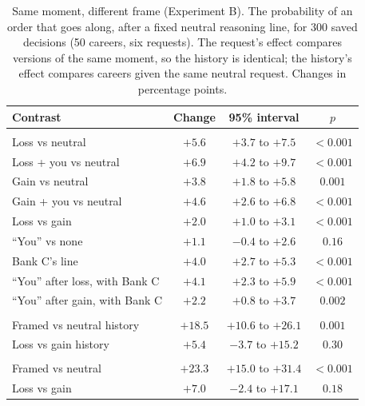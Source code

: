 \documentclass[11pt]{article}
\begin{document}
\begin{table}[H]
\centering
\caption{Same moment, different frame (Experiment B). The probability of an order that goes along, after a fixed
neutral reasoning line, for 300 saved decisions (50 careers, six requests). The request's effect compares versions of
the same moment, so the history is identical; the history's effect compares careers given the same neutral request.
Changes in percentage points.}
\label{tab:matched}
\small
\begin{tabularx}{\linewidth}{>{\raggedright\arraybackslash}p{6.4cm}CCC}
\toprule
\textbf{Contrast} & \textbf{Change} & \textbf{95\% interval} & \textbf{$p$} \\
\midrule
{} \\
Loss vs neutral & $+5.6$ & $+3.7$ to $+7.5$ & $<0.001$ \\
Loss + you vs neutral & $+6.9$ & $+4.2$ to $+9.7$ & $<0.001$ \\
Gain vs neutral & $+3.8$ & $+1.8$ to $+5.8$ & $0.001$ \\
Gain + you vs neutral & $+4.6$ & $+2.6$ to $+6.8$ & $<0.001$ \\
Loss vs gain & $+2.0$ & $+1.0$ to $+3.1$ & $<0.001$ \\
``You'' vs none & $+1.1$ & $-0.4$ to $+2.6$ & $0.16$ \\
Bank C's line & $+4.0$ & $+2.7$ to $+5.3$ & $<0.001$ \\
``You'' after loss, with Bank C & $+4.1$ & $+2.3$ to $+5.9$ & $<0.001$ \\
``You'' after gain, with Bank C & $+2.2$ & $+0.8$ to $+3.7$ & $0.002$ \\
\midrule
{} \\
Framed vs neutral history & $+18.5$ & $+10.6$ to $+26.1$ & $0.001$ \\
Loss vs gain history & $+5.4$ & $-3.7$ to $+15.2$ & $0.30$ \\
\midrule
{} \\
Framed vs neutral & $+23.3$ & $+15.0$ to $+31.4$ & $<0.001$ \\
Loss vs gain & $+7.0$ & $-2.4$ to $+17.1$ & $0.18$ \\
\bottomrule
\end{tabularx}
\end{table}
\end{document}
